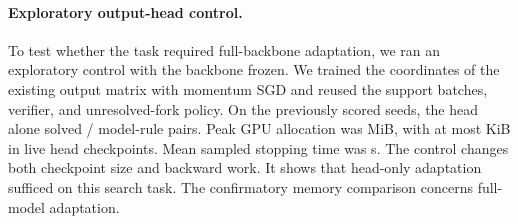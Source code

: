\paragraph{Exploratory output-head control.}
To test whether the task required full-backbone adaptation, we
ran an exploratory control with the backbone frozen. We trained
the \PthreeHeadParams{} coordinates of the existing output
matrix with momentum SGD and reused the support batches,
verifier, and unresolved-fork policy. On the previously scored
seeds, the head alone solved
\PthreeHeadSolved{}/\PthreeHeadCases{} model-rule pairs. Peak
GPU allocation was \PthreeHeadMiB{} MiB, with at most
\PthreeHeadKiB{} KiB in live head checkpoints. Mean sampled
stopping time was \PthreeHeadStopSeconds{} s. The control
changes both checkpoint size and backward work. It shows that
head-only adaptation sufficed on this search task. The
confirmatory memory comparison concerns full-model adaptation.
